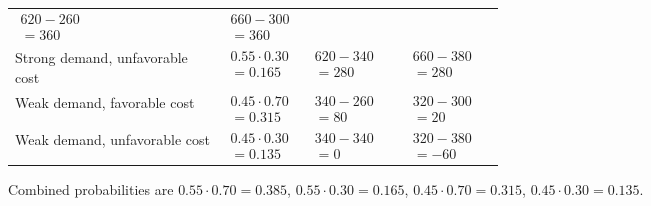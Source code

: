 \begin{ExamProblems}
\begin{center}
\begin{tabular}{l p{0.17\linewidth} p{0.2\linewidth} p{0.2\linewidth}}
				$\begin{array}{l}
					620 - 260\\
					= 360
				\end{array}$ &
				$\begin{array}{l}
					660 - 300\\
					= 360
				\end{array}$ \\
				Strong demand, unfavorable cost &
				$\begin{array}{l}
					0.55\cdot 0.30\\
					= 0.165
				\end{array}$ &
				$\begin{array}{l}
					620 - 340\\
					= 280
				\end{array}$ &
				$\begin{array}{l}
					660 - 380\\
					= 280
				\end{array}$ \\
				Weak demand, favorable cost &
				$\begin{array}{l}
					0.45\cdot 0.70\\
					= 0.315
				\end{array}$ &
				$\begin{array}{l}
					340 - 260\\
					= 80
				\end{array}$ &
				$\begin{array}{l}
					320 - 300\\
					= 20
				\end{array}$ \\
				Weak demand, unfavorable cost &
				$\begin{array}{l}
					0.45\cdot 0.30\\
					= 0.135
				\end{array}$ &
				$\begin{array}{l}
					340 - 340\\
					= 0
				\end{array}$ &
				$\begin{array}{l}
					320 - 380\\
					= -60
				\end{array}$ \\
				\bottomrule
		\end{tabular}
		\end{center}
		Combined probabilities are $0.55\cdot 0.70=0.385$, $0.55\cdot 0.30=0.165$, $0.45\cdot 0.70=0.315$, $0.45\cdot 0.30=0.135$.

\end{ExamProblems}
